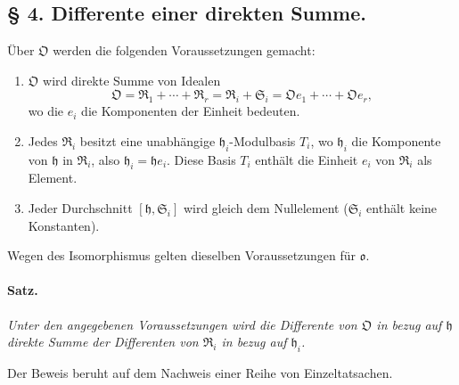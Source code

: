 \subsection*{\S{} 4. Differente einer direkten Summe.}

Über $\mathfrak O$ werden die folgenden Voraussetzungen gemacht:

\begin{enumerate}
\item[(1)] $\mathfrak O$ wird direkte Summe von Idealen
\[
\mathfrak O=\mathfrak R_1+\cdots+\mathfrak R_r
=\mathfrak R_i+\mathfrak S_i
=\mathfrak Oe_1+\cdots+\mathfrak Oe_r,
\]
wo die $e_i$ die Komponenten der Einheit bedeuten.

\item[(2)] Jedes $\mathfrak R_i$ besitzt eine unabhängige $\mathfrak h_i$-Modulbasis $T_i$, wo $\mathfrak h_i$ die Komponente von $\mathfrak h$ in $\mathfrak R_i$, also $\mathfrak h_i=\mathfrak h e_i$. Diese Basis $T_i$ enthält die Einheit $e_i$ von $\mathfrak R_i$ als Element.

\item[(3)] Jeder Durchschnitt $[\mathfrak h,\mathfrak S_i]$ wird gleich dem Nullelement ($\mathfrak S_i$ enthält keine Konstanten).
\end{enumerate}

Wegen des Isomorphismus gelten dieselben Voraussetzungen für $\mathfrak o$.

\paragraph{Satz.}
\emph{Unter den angegebenen Voraussetzungen wird die Differente von $\mathfrak O$ in bezug auf $\mathfrak h$ direkte Summe der Differenten von $\mathfrak R_i$ in bezug auf $\mathfrak h_i$.}

Der Beweis beruht auf dem Nachweis einer Reihe von Einzeltatsachen.

